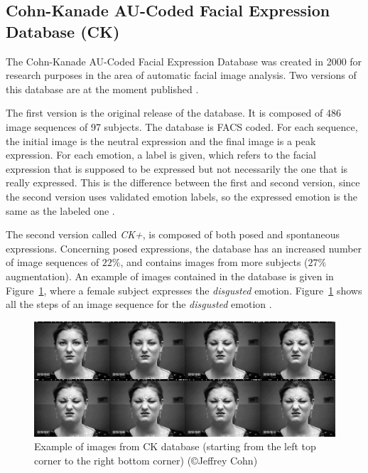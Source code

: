 \subsection{Cohn-Kanade AU-Coded Facial Expression Database (CK)}

\vspace{\baselineskip}
\noindent The Cohn-Kanade AU-Coded Facial Expression Database was created in 2000 for research purposes in the area of automatic facial image analysis. Two versions of this database are at the moment published \cite{CK}.
\newline

\noindent The first version is the original release of the database. It is composed of 486 image sequences of 97 subjects. The database is FACS coded. For each sequence, the initial image is the neutral expression and the final image is a peak expression. For each emotion, a label is given, which refers to the facial expression that is supposed to be expressed but not necessarily the one that is really expressed. This is the difference between the first and second version, since the second version uses validated emotion labels, so the expressed emotion is the same as the labeled one \cite{CK}.
\newline

\noindent The second version called \textit{CK+}, is composed of both posed and spontaneous expressions. Concerning posed expressions, the database has an increased number of image sequences of $22\%$, and contains images from more subjects ($27\%$ augmentation). An example of images contained in the database is given in Figure~\ref{ck_facs_coded}, where a female subject expresses the \textit{disgusted} emotion. Figure~\ref{ck_facs_coded} shows all the steps of an image sequence for the \textit{disgusted} emotion \cite{CK}.
\newline

\begin{figure}[!h]
\begin{center}
\noindent \includegraphics[scale=0.4]{figures/ck_facs_coded} 
\newline
\caption{Example of images from CK database (starting from the left top corner to the right bottom corner) (\copyright Jeffrey Cohn)}
\label{ck_facs_coded}
\end{center} 
\end{figure}

